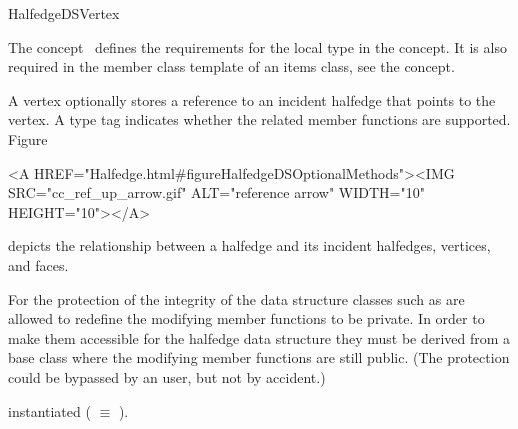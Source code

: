 
\ccRefPageBegin



\begin{ccRefConcept}{HalfedgeDSVertex}
\label{pageHalfedgeDSItemsVertexRef}

\ccDefinition
  
The concept \ccRefName\ defines the requirements for the local  
type in the  concept. It is also required in 
the  member class template of an
items class, see the  concept.

A vertex optionally stores a reference to an incident halfedge that
points to the vertex. A type tag indicates whether the related member
functions are supported. Figure~\begin{ccHtmlOnly}
  <A HREF="Halfedge.html#figureHalfedgeDSOptionalMethods"><IMG 
  SRC="cc_ref_up_arrow.gif" ALT="reference arrow" WIDTH="10" HEIGHT="10"></A>
\end{ccHtmlOnly}
depicts the relationship between a halfedge and its incident
halfedges, vertices, and faces.

For the protection of the integrity of the data structure classes such as
 are allowed to redefine the modifying member 
functions to be private. In order to make them accessible for the 
halfedge data structure they must be derived from a base class 
where the modifying member functions are still public. (The protection 
could be bypassed by an user, but not by accident.)

\ccTypes
{}
\ccThreeToTwo

    {instantiated  ( $\equiv$ ).}
\ccGlue
{}
\ccGlue
{}
\ccGlue
{}
\ccGlue
{}
\ccGlue
{}
\ccGlue
{}
\ccGlue
{}
\ccGlue
{}
\ccGlue
{}
\ccGlue
{}


\end{ccRefConcept}
